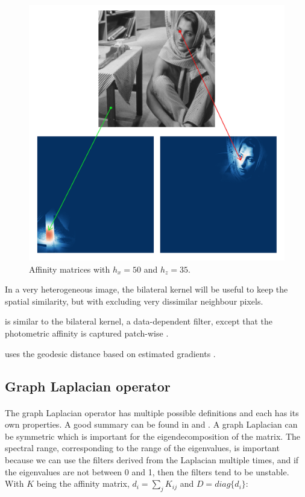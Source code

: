 \begin{description}[align=left]
  \begin{figure}[H]
      \centering
      \includegraphics[width=\textwidth]{img/bilateralAffinityPhoto35Spatial50.png}
      \caption{Affinity matrices with \(h_x = 50\) and \(h_z = 35\).}
  \end{figure}
  In a very heterogeneous image, the bilateral kernel will be useful to keep the spatial similarity, but with excluding very dissimilar neighbour pixels.

 \item [Non-local means (NLM)] is similar to the bilateral kernel, a data-dependent filter, except that the photometric affinity is captured patch-wise \cite{glide_2014} \cite{kervrann_nlm_2006}.
 \item [Locally adaptive regression kernel (LARK)] uses the geodesic distance based on estimated gradients \cite{milanfar_symmetrizing_2013} \cite{takeda_kernel_2007}.
\end{description}

\subsection{Graph Laplacian operator}

\paragraph{}
The graph Laplacian operator has multiple possible definitions and each has its own properties.
A good summary can be found in \cite{siam_slides_2016} and \cite{chung_spectral_1997}.
A graph Laplacian can be symmetric which is important for the eigendecomposition of the matrix.
The spectral range, corresponding to the range of the eigenvalues, is important because we can use the filters derived from the Laplacian multiple times, and if the eigenvalues are not between 0 and 1, then the filters tend to be unstable.
With \(K\) being the affinity matrix, \(d_i = \sum_j K_{ij}\) and \(D = diag\{d_i\}\):

